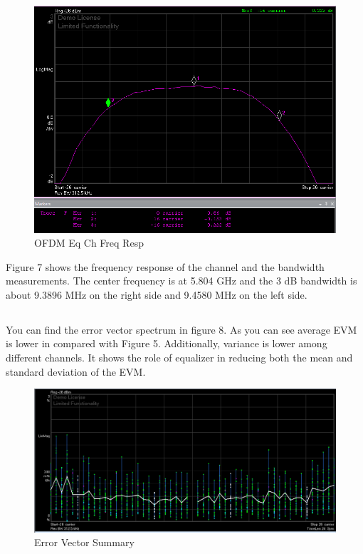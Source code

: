 \documentclass{article}
\begin{document}
\subsection{}
\begin{figure}[htb!]
    \centering
    \includegraphics[scale=0.5]{ofdm-eq-ch-freq-resp}
    \caption{OFDM Eq Ch Freq Resp}
\end{figure}

Figure 7 shows the frequency response of the channel and the bandwidth measurements. The center frequency is at 5.804 GHz and the 3 dB bandwidth is about 9.3896 MHz on the right side and 9.4580 MHz on the left side.

\subsection{}
You can find the error vector spectrum in figure 8. As you can see average EVM is lower in compared with Figure 5. Additionally, variance is lower among different channels. It shows the role of equalizer in reducing both the mean and standard deviation of the EVM.

\begin{figure}[htb!]
    \centering
    \includegraphics[scale=0.45]{error-vector-spectrum-new}
    \caption{Error Vector Summary}
\end{figure}
\end{document}
